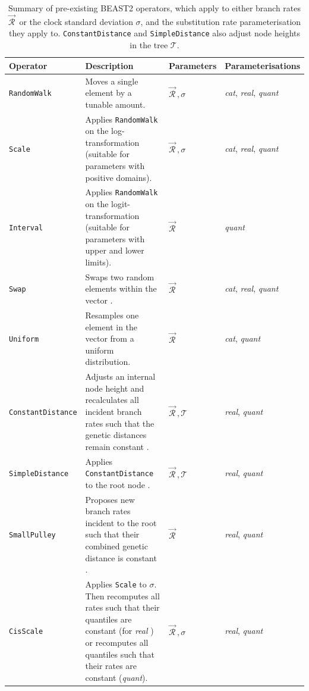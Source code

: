 \documentclass[10pt,letterpaper]{article}
\begin{document}
\begin{table}[h!]
\centering
\begin{tabular}{l p{4.2cm} l l} 
 Operator & Description & Parameters & Parameterisations  \\
  \hline
 \texttt{RandomWalk} & Moves a single element by a tunable amount. & $\vec{\mathcal{R}}^{\,}, \sigma$ & \textit{cat}, \textit{real}, \textit{quant} \\
  \hline
\texttt{Scale} & Applies \texttt{RandomWalk} on the log-transformation (suitable for parameters with positive domains). & $\vec{\mathcal{R}}^{\,}, \sigma$ & \textit{cat}, \textit{real}, \textit{quant}  \\
  \hline
 \texttt{Interval} & Applies \texttt{RandomWalk} on the logit-transformation (suitable for parameters with upper and lower limits). & $\vec{\mathcal{R}}^{\,}$ & \textit{quant}  \\
  \hline
 \texttt{Swap} & Swaps two random elements within the vector \cite{drummond2006relaxed}. & $\vec{\mathcal{R}}^{\,}$  & \textit{cat}, \textit{real}, \textit{quant}  \\
 \hline
\texttt{Uniform} & Resamples one element in the vector from a uniform distribution. & $\vec{\mathcal{R}}^{\,}$  & \textit{cat}, \textit{quant}  \\
 \hline
\texttt{ConstantDistance} & Adjusts an internal node height and recalculates all incident branch rates such that the genetic distances remain constant \cite{zhang2020improving}.  & $\vec{\mathcal{R}}^{\,}, \mathcal{T}$ & \textit{real}, \textit{quant} \\
 \hline
\texttt{SimpleDistance} & Applies \texttt{ConstantDistance} to the root node \cite{zhang2020improving}.  & $\vec{\mathcal{R}}^{\,}, \mathcal{T}$ & \textit{real}, \textit{quant} \\
 \hline
\texttt{SmallPulley} & Proposes new branch rates incident to the root such that their combined genetic distance is constant  \cite{zhang2020improving}.  & $\vec{\mathcal{R}}^{\,}$ & \textit{real}, \textit{quant} \\
 \hline
\texttt{CisScale} & Applies \texttt{Scale} to $\sigma$. Then recomputes all rates such that their quantiles are constant (for \textit{real} \cite{zhang2020improving}) or recomputes all quantiles such that their rates are constant (\textit{quant}).  & $\vec{\mathcal{R}}^{\,}, \sigma$ & \textit{real}, \textit{quant} \\
\end{tabular}
\caption{Summary of pre-existing BEAST2 operators, which apply to either branch rates $\vec{\mathcal{R}}^{\,}$ or the clock standard deviation $\sigma$, and the substitution rate parameterisation they apply to.
 \texttt{ConstantDistance} and \texttt{SimpleDistance} also adjust node heights in the tree $\mathcal{T}$. }
\label{table:kernels}
\end{table}
\end{document}
